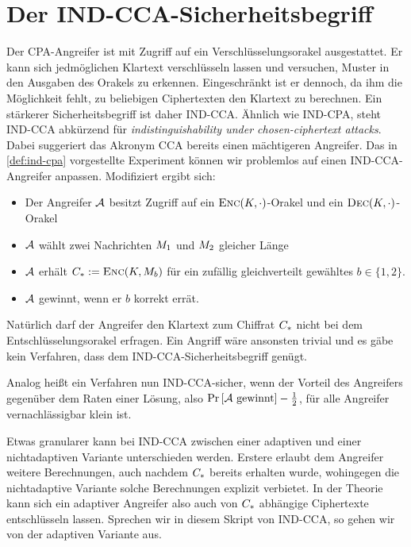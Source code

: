 \section{Der IND-CCA-Sicherheitsbegriff}
Der CPA-Angreifer ist mit Zugriff auf ein Verschlüsselungsorakel ausgestattet. Er kann sich jedmöglichen Klartext verschlüsseln lassen und
versuchen, Muster in den Ausgaben des Orakels zu erkennen. Eingeschränkt ist er dennoch, da ihm die Möglichkeit fehlt, zu beliebigen
Ciphertexten den Klartext zu berechnen. Ein stärkerer Sicherheitsbegriff ist daher IND-CCA. Ähnlich wie IND-CPA, steht IND-CCA abkürzend für \emph{indistinguishability under chosen-ciphertext attacks}. Dabei suggeriert das Akronym CCA bereits einen mächtigeren Angreifer. Das in \ref{def:ind-cpa} vorgestellte Experiment können wir problemlos auf einen IND-CCA-Angreifer anpassen. Modifiziert ergibt sich:

\begin{itemize}
	\item Der Angreifer $\mathcal{A}$ besitzt Zugriff auf ein $\textsc{Enc}(K,\cdot)$-Orakel und ein $\textsc{Dec}(K,\cdot)$-Orakel
	\item $\mathcal{A}$ wählt zwei Nachrichten $M_1$ und $M_2$ gleicher Länge
	\item $\mathcal{A}$ erhält $C_* := \textsc{Enc}(K, M_{b})$  für ein zufällig gleichverteilt gewähltes $b \in \{1, 2\}$.
	\item $\mathcal{A}$ gewinnt, wenn er $b$ korrekt errät.
\end{itemize} 

Natürlich darf der Angreifer den Klartext zum Chiffrat $C_*$ nicht bei dem Entschlüsselungsorakel erfragen. Ein Angriff wäre ansonsten trivial und es gäbe kein Verfahren, dass dem IND-CCA-Sicherheitsbegriff genügt. 

Analog heißt ein Verfahren nun IND-CCA-sicher, wenn der Vorteil des Angreifers gegenüber dem Raten einer Lösung, also $\text{Pr} \left[ \mathcal{A}\ \text{gewinnt} \right] - \frac{1}{2}$, für alle Angreifer vernachlässigbar klein ist.

Etwas granularer kann bei IND-CCA zwischen einer adaptiven und einer nichtadaptiven Variante unterschieden werden. Erstere erlaubt dem Angreifer weitere Berechnungen, auch nachdem $C_*$ bereits erhalten wurde, wohingegen die nichtadaptive Variante solche Berechnungen explizit verbietet. In der Theorie kann sich ein adaptiver Angreifer also auch von $C_*$ abhängige Ciphertexte entschlüsseln lassen. Sprechen wir in diesem Skript von IND-CCA, so gehen wir von der adaptiven Variante aus.
